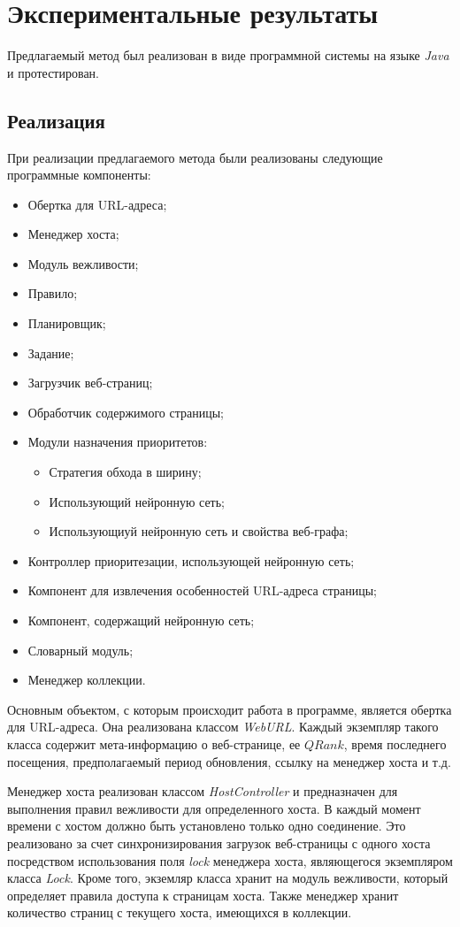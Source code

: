 \chapter{Экспериментальные результаты}
\label{chapter_experiment}

Предлагаемый метод был реализован в виде программной системы на языке \textit{Java} и протестирован.

\section{Реализация}

При реализации предлагаемого метода были реализованы следующие программные компоненты:
\begin{itemize}
\item Обертка для URL-адреса;
\item Менеджер хоста;
\item Модуль вежливости;
\item Правило;
\item Планировщик;
\item Задание;
\item Загрузчик веб-страниц;
\item Обработчик содержимого страницы;
\item Модули назначения приоритетов:
\begin{itemize}
\item Стратегия обхода в ширину;
\item Использующий нейронную сеть;
\item Использующиуй нейронную сеть и свойства веб-графа;
\end{itemize}
\item Контроллер приоритезации, использующей нейронную сеть;
\item Компонент для извлечения особенностей URL-адреса страницы;
\item Компонент, содержащий нейронную сеть;
\item Словарный модуль;
\item Менеджер коллекции.
\end{itemize}

Основным объектом, с которым происходит работа в программе, является обертка для URL-адреса. Она реализована классом \textit{WebURL}. Каждый экземпляр такого класса содержит мета-информацию о веб-странице, ее $QRank$, время последнего посещения, предполагаемый период обновления, ссылку на менеджер хоста и т.д.

Менеджер хоста  реализован классом \textit{HostController} и предназначен для выполнения правил вежливости для определенного хоста. В каждый момент времени с хостом должно быть установлено только одно соединение. Это реализовано за счет синхронизирования загрузок веб-страницы с одного хоста посредством использования поля \textit{lock} менеджера хоста, являющегося экземпляром класса \textit{Lock}. Кроме того, экземляр класса хранит на модуль вежливости, который определяет правила доступа к страницам хоста. Также менеджер хранит количество страниц с текущего хоста, имеющихся в коллекции.

